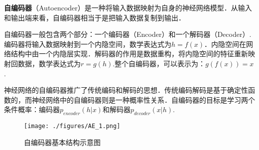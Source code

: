 
\textbf{自编码器}（Autoencoder）是一种将输入数据映射为自身的神经网络模型．从输入和输出端来看，自编码器相当于是把输入数据复制到输出．

自编码器一般包含两个部分：一个编码器（Encoder）和一个解码器（Decoder）.编码器将输入数据映射到一个内隐空间，数学表达式为$h=f(x)$．内隐空间在网络结构中由一个内隐层实现．解码器的作用是数据重构，将内隐空间的特征重新映射回数据，数学表达式为$r=g(h)$.整个自编码器，可以表示为：$g(f(x))=x$.

神经网络的自编码器推广了传统编码和解码的思想．传统编码解码是基于确定性函数的，而神经网络中的自编码器则是一种概率性关系．自编码器的目标是学习两个条件概率：编码器$p_{encoder}(h|x)$和解码器$p_{decoder}(x|h)$\cite{GDL}.

\begin{figure}[ht]
\centering
\texttt{[image: ./figures/AE\_1.png]}
\caption{自编码器基本结构示意图} \label{AE_fig1}
\end{figure}
